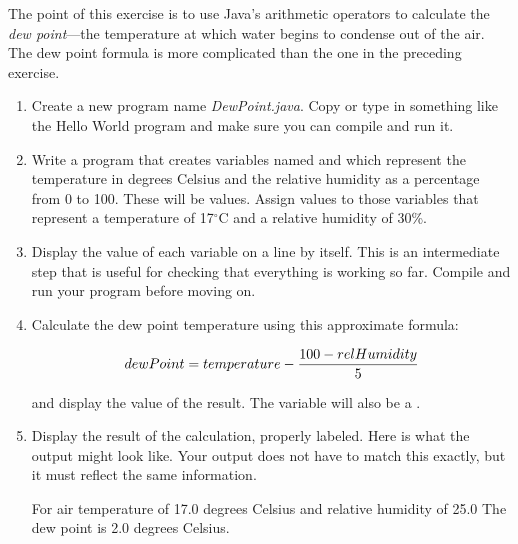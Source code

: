 \begin{exercise}
\label{ex:dewpoint}
The point of this exercise is to use Java's arithmetic operators to calculate the {\it dew point}---the temperature at which water begins to condense out of the air. The dew point formula is more complicated than the one in the preceding exercise.

\begin{enumerate}

\item Create a new program name {\it DewPoint.java}.
Copy or type in something like the Hello World program and make sure you can compile and run it.

\item Write a program that creates variables named  and  which represent the temperature in degrees Celsius and the relative humidity as a percentage from 0 to 100. These will be  values. Assign values to those variables that represent a temperature of 17$^\circ$C and a relative humidity of 30\%.

\item Display the value of each variable on a line by itself.
This is an intermediate step that is useful for checking that everything is working so far.
Compile and run your program before moving on.

\item Calculate the dew point temperature using this approximate formula:

\begin{equation*}
dewPoint = temperature - {{100 - relHumidity} \over 5}
\end{equation*}

and display the value of the result. The  variable will also be a .

\item Display the result of the calculation, properly labeled. Here is what the output might look like. Your output does not have to match
this exactly, but it must reflect the same information.

\begin{stdout}
For air temperature of 17.0 degrees Celsius
and relative humidity of 25.0%
The dew point is 2.0 degrees Celsius.
\end{stdout}
\end{enumerate}

\end{exercise}

